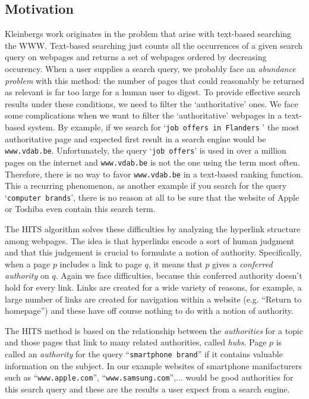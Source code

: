 \documentclass[a4paper,11pt]{report}
\begin{document}
\subsection{Motivation}\label{motivatiehits}
Kleinbergs work originates in the problem that arise with text-based searching the WWW. Text-based searching just counts all the occurrences of a given search query on webpages and returns a set of webpages ordered by decreasing occurency.
When a user 
supplies a search query, we probably face an \textit{abundance problem} with this method: the number of pages that could reasonably be returned as relevant is
far too large for a human user to digest. To provide effective search results 
under these conditions, we need to filter the `authoritative' ones. We face some complications when we
want to filter the `authoritative' webpages in a text-based system. By example, if we search for `\texttt{job offers in Flanders} 
' the most authoritative page and expected first result in a search engine would be \texttt{www.vdab.be}. 
Unfortunately, the query  `\texttt{job offers}' is used in over a 
million pages on the internet and \texttt{www.vdab.be} is not the one using the 
term most often. Therefore, there is no way to favor \texttt{www.vdab.be} in a 
text-based ranking function. This a recurring phenomenon, as another example if 
you search for the query `\texttt{computer brands}', there is no reason at all to be sure that the 
website of Apple or Toshiba even contain this search term.

The HITS algorithm solves these difficulties by analyzing the hyperlink 
structure among webpages. The idea is that hyperlinks encode a sort of human 
judgment and that this judgement is crucial to formulate a notion of authority. 
Specifically, when a page $p$ includes a link to page $q$, it means 
that $p$ gives a \textit{conferred authority} on $q$. Again we face difficulties, because this conferred authority doesn't 
hold for every link. Links are created for a wide variety of reasons, for 
example, a large number of links are created for navigation within a website (e.g. ``Return to homepage'') 
and these have off course nothing to do with a notion of authority. 

The HITS method is based on the relationship between the \textit{authorities} for a topic 
and those pages that link to many related authorities, called \emph{hubs}. Page $p$ 
is called an \textit{authority} for the query ``\texttt{smartphone brand}'' if it 
contains valuable information on the subject. In our example websites of 
smartphone manifacturers such as ``\texttt{www.apple.com}'', 
``\texttt{www.samsung.com}'',... would be good authorities for this search 
query and these are the results a user expect from a search engine. 
\end{document}
